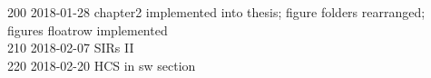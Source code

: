 \begin{footnotesize}
200	2018-01-28	chapter2 implemented into thesis; figure folders rearranged; figures floatrow implemented\\
210	2018-02-07	SIRs II\\
220	2018-02-20	HCS in sw section\\

\end{footnotesize}
